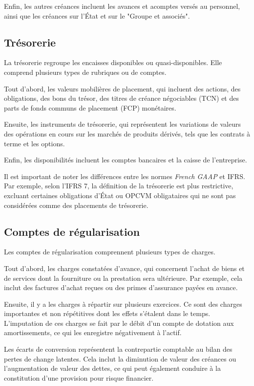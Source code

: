 \documentclass[a4paper, 12pt]{report}
\begin{document}
Enfin, les autres créances incluent les avances et acomptes versés au personnel, ainsi que les créances sur l'État et sur le "Groupe et associés".

\subsection{Trésorerie}

La trésorerie regroupe les encaisses disponibles ou quasi-disponibles. Elle comprend plusieurs types de rubriques ou de comptes.

Tout d'abord, les valeurs mobilières de placement, qui incluent des actions, des obligations, des bons du trésor, des titres de créance négociables (TCN) et des parts de fonds communs de placement (FCP) monétaires. 

Ensuite, les instruments de trésorerie, qui représentent les variations de valeurs des opérations en cours sur les marchés de produits dérivés, tels que les contrats à terme et les options.

Enfin, les disponibilités incluent les comptes bancaires et la caisse de l'entreprise.

Il est important de noter les différences entre les normes \textit{French GAAP} et IFRS. Par exemple, selon l'IFRS 7, la définition de la trésorerie est plus restrictive, excluant certaines obligations d'État ou OPCVM obligataires qui ne sont pas considérées comme des placements de trésorerie.

\subsection{Comptes de régularisation}

Les comptes de régularisation comprennent plusieurs types de charges. 

Tout d'abord, les charges constatées d'avance, qui concernent l'achat de biens et de services dont la fourniture ou la prestation sera ultérieure. Par exemple, cela inclut des factures d'achat reçues ou des primes d'assurance payées en avance.

Ensuite, il y a les charges à répartir sur plusieurs exercices. Ce sont des charges importantes et non répétitives dont les effets s'étalent dans le temps. L'imputation de ces charges se fait par le débit d'un compte de dotation aux amortissements, ce qui les enregistre négativement à l'actif.

Les écarts de conversion représentent la contrepartie comptable au bilan des pertes de change latentes. Cela inclut la diminution de valeur des créances ou l'augmentation de valeur des dettes, ce qui peut également conduire à la constitution d'une provision pour risque financier.
\end{document}
